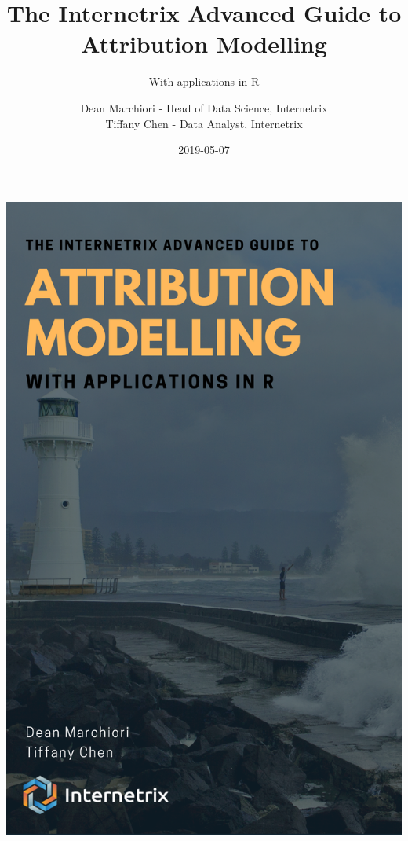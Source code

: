 \documentclass[]{book}
\title{The Internetrix Advanced Guide to Attribution Modelling}
\subtitle{With applications in R}
\author{Dean Marchiori - Head of Data Science, Internetrix \\ Tiffany Chen - Data Analyst, Internetrix}
\date{2019-05-07}
\let\oldmaketitle\maketitle
\begin{document}
\maketitle

\thispagestyle{empty}
\begin{center}
\includegraphics{cover.png}
\end{center}

\let\maketitle\oldmaketitle
\maketitle
\end{document}
